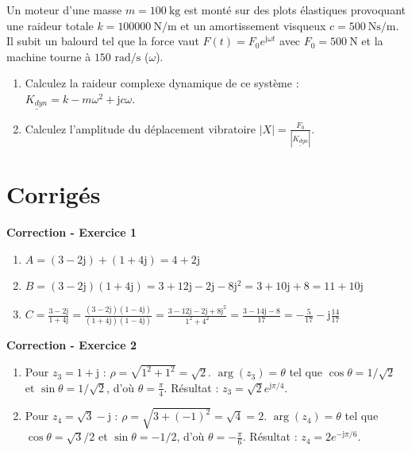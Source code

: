 \documentclass[11pt,a4paper]{article}
\newcommand{\jc}{\mathrm{j}} %
\newcommand{\cpx}[1]{\underline{#1}} %
\begin{document}
\vspace{0.5cm}
\begin{tcolorbox}[colback=green!5!white, colframe=green!60!black, title=\textbf{Exercice 5 : Analyse Vibratoire Simple}]
Un moteur d'une masse $m=\SI{100}{\kilo\gram}$ est monté sur des plots élastiques provoquant une raideur totale $k=\SI{100000}{\newton\per\meter}$ et un amortissement visqueux $c=\SI{500}{\newton\second\per\meter}$. Il subit un balourd tel que la force vaut $F(t) = F_0 e^{\jc \omega t}$ avec $F_0 = \SI{500}{\newton}$ et la machine tourne à $150 \text{ rad/s}$ ($\omega$).
\begin{enumerate}
    \item Calculez la raideur complexe dynamique de ce système : $\cpx{K_{dyn}} = k - m\omega^2 + \jc c\omega$.
    \item Calculez l'amplitude du déplacement vibratoire $|X| = \frac{F_0}{|\cpx{K_{dyn}}|}$.
\end{enumerate}
\end{tcolorbox}

\newpage
\section{Corrigés}

\textbf{Correction - Exercice 1}
\begin{enumerate}
    \item $A = (3 - 2\jc) + (1 + 4\jc) = 4 + 2\jc$
    \item $B = (3 - 2\jc)(1 + 4\jc) = 3 + 12\jc - 2\jc - 8\jc^2 = 3 + 10\jc + 8 = 11 + 10\jc$
    \item $C = \frac{3 - 2\jc}{1 + 4\jc} = \frac{(3 - 2\jc)(1 - 4\jc)}{(1 + 4\jc)(1 - 4\jc)} = \frac{3 - 12\jc - 2\jc + 8\jc^2}{1^2 + 4^2} = \frac{3 - 14\jc - 8}{17} = -\frac{5}{17} - \jc \frac{14}{17}$
\end{enumerate}

\vspace{0.5cm}
\textbf{Correction - Exercice 2}
\begin{enumerate}
    \item Pour $z_3 = 1 + \jc$ : $\rho = \sqrt{1^2 + 1^2} = \sqrt{2}$. $\arg(z_3) = \theta$ tel que $\cos\theta = 1/\sqrt{2}$ et $\sin\theta = 1/\sqrt{2}$, d'où $\theta = \frac{\pi}{4}$. Résultat : $z_3 = \sqrt{2} e^{\jc \pi/4}$.
    \item Pour $z_4 = \sqrt{3} - \jc$ : $\rho = \sqrt{3 + (-1)^2} = \sqrt{4} = 2$. $\arg(z_4) = \theta$ tel que $\cos\theta = \sqrt{3}/2$ et $\sin\theta = -1/2$, d'où $\theta = -\frac{\pi}{6}$. Résultat : $z_4 = 2 e^{-\jc \pi/6}$.
\end{enumerate}
\end{document}
